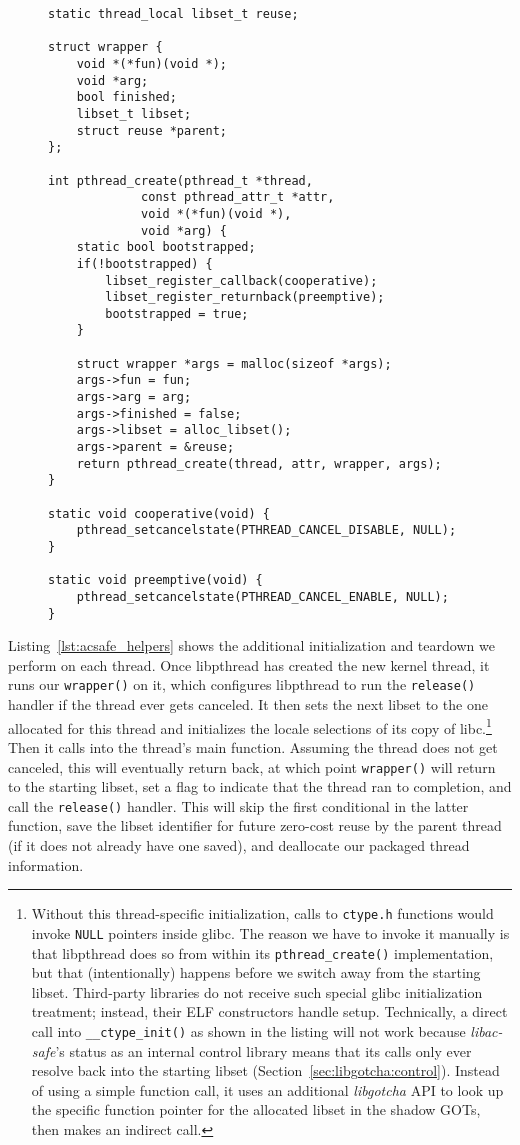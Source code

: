 \begin{figure}
\begin{lstlisting}[label=lst:acsafe_gotchas,caption=\textit{libac-safe}'s \texttt{pthread\_create()} replacement and control library callbacks,morekeywords=thread_local]
static thread_local libset_t reuse;

struct wrapper {
	void *(*fun)(void *);
	void *arg;
	bool finished;
	libset_t libset;
	struct reuse *parent;
};

int pthread_create(pthread_t *thread,
		     const pthread_attr_t *attr,
		     void *(*fun)(void *),
		     void *arg) {
	static bool bootstrapped;
	if(!bootstrapped) {
		libset_register_callback(cooperative);
		libset_register_returnback(preemptive);
		bootstrapped = true;
	}

	struct wrapper *args = malloc(sizeof *args);
	args->fun = fun;
	args->arg = arg;
	args->finished = false;
	args->libset = alloc_libset();
	args->parent = &reuse;
	return pthread_create(thread, attr, wrapper, args);
}

static void cooperative(void) {
	pthread_setcancelstate(PTHREAD_CANCEL_DISABLE, NULL);
}

static void preemptive(void) {
	pthread_setcancelstate(PTHREAD_CANCEL_ENABLE, NULL);
}
\end{lstlisting}
\end{figure}

Listing~\ref{lst:acsafe_helpers} shows the additional initialization and teardown we
perform on each thread.  Once libpthread has created the new kernel thread, it runs
our \texttt{wrapper()} on it, which configures libpthread to run the
\texttt{release()} handler if the thread ever gets canceled.  It then sets the next
libset to the one allocated for this thread and initializes the locale selections of
its copy of libc.\footnote{Without this thread-specific initialization, calls to
\texttt{ctype.h} functions would invoke \texttt{NULL} pointers inside glibc.  The
reason we have to invoke it manually is that libpthread does so from within its
\texttt{pthread\_create()} implementation, but that (intentionally) happens before we
switch away from the starting libset.  Third-party libraries do not receive such
special glibc initialization treatment; instead, their ELF constructors handle setup.
Technically, a direct call into \texttt{\_\_ctype\_init()} as shown in the listing
will not work because \textit{libac-safe}'s status as an internal control library
means that its calls only ever resolve back into the starting libset
(Section~\ref{sec:libgotcha:control}).  Instead of using a simple function call, it
uses an additional \textit{libgotcha} API to look up the specific function pointer
for the allocated libset in the shadow GOTs, then makes an indirect call.}  Then it
calls into the thread's main function.  Assuming the thread does not get canceled,
this will eventually return back, at which point \texttt{wrapper()} will return to
the starting libset, set a flag to indicate that the thread ran to completion, and
call the \texttt{release()} handler.  This will skip the first conditional in the
latter function, save the libset identifier for future zero-cost reuse by the parent
thread (if it does not already have one saved), and deallocate our packaged thread
information.

